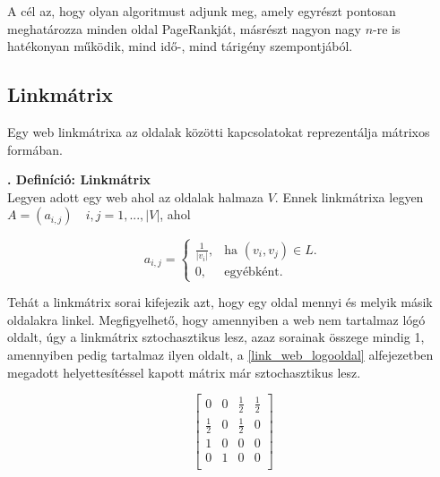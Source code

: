 \documentclass[12pt,a4paper]{article}
\newcounter{definicioszam}
\newenvironment{definicio}[1]
{{\medskip}\noindent \stepcounter{definicioszam}
{\bfseries{\thedefinicioszam. Definíció: #1\\[1ex]}}}{\bigskip }
\begin{document}
A cél az, hogy olyan algoritmust adjunk meg, amely egyrészt pontosan meghatározza minden oldal PageRankját, másrészt nagyon nagy $n$-re is hatékonyan működik, mind idő-, mind tárigény szempontjából. 

\subsection{Linkmátrix}\label{linkmatrix}

Egy web linkmátrixa az oldalak közötti kapcsolatokat reprezentálja mátrixos formában.

\begin{definicio}{Linkmátrix}
	Legyen adott egy web ahol az oldalak halmaza $V$. Ennek linkmátrixa legyen $A = (a_{i,j}) \quad i,j = 1,...,|V| $, ahol
	
	\begin{equation*}
	a_{i,j}=\begin{cases}
	\frac{1}{ |v_i| }, & \text{ha $(v_i,v_j) \in L$}.\\
	0, & \text{egyébként}.
	\end{cases}
	\end{equation*}
	
\end{definicio}

Tehát a linkmátrix sorai kifejezik azt, hogy egy oldal mennyi és melyik másik oldalakra linkel. Megfigyelhető, hogy amennyiben a web nem tartalmaz lógó oldalt, úgy a linkmátrix sztochasztikus lesz, azaz sorainak összege mindig 1, amennyiben pedig tartalmaz ilyen oldalt, a \ref{link_web_logooldal} alfejezetben megadott helyettesítéssel kapott mátrix már sztochasztikus lesz. 

\bigskip
\begin{minipage}{0.4\textwidth}
	\begin{center}
	\end{center}
\end{minipage}
\begin{minipage}{0.5\textwidth}
	\begin{center}
		\[
		\begin{bmatrix}
		0 & 0 & \frac{1}{2} & \frac{1}{2} \\  
		\frac{1}{2} & 0 & \frac{1}{2} & 0 \\
		1 & 0 & 0 & 0 \\
		0 & 1 & 0 & 0 \\
		\end{bmatrix}
		\]
	\end{center}
\end{minipage}
\end{document}
